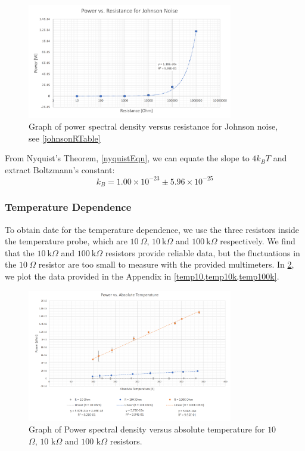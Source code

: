 \documentclass[12pt]{article}
\begin{document}
	\begin{figure}[H]
		\centering
		\includegraphics[width=0.8\textwidth]{powerR.png}
		\caption{Graph of power spectral density versus resistance for Johnson noise, see \cref{johnsonRTable}}
		\label{powerR}
	\end{figure}

	From Nyquist's Theorem, \cref{nyquistEqn}, we can equate the slope to $4k_BT$ and extract Boltzmann's constant:
	\begin{equation}
		k_B = 1.00 \times 10^{-23} \pm 5.96\times 10^{-25}
	\end{equation}
	
	
	
	\subsubsection*{Temperature Dependence}
	To obtain date for the temperature dependence, we use the three resistors inside the temperature probe, which are $10 \ \Omega$, $10 \ \text{k}\Omega$ and $100 \ \text{k}\Omega$ respectively. We find that the $10 \ \text{k}\Omega$ and $100 \ \text{k}\Omega$ resistors provide reliable data, but the fluctuations in the $10 \ \Omega$ resistor are too small to measure with the provided multimeters. In \cref{tempGraphs}, we plot the data provided in the Appendix in \cref{temp10,temp10k,temp100k}.
	
	\begin{figure}[H]
		\centering
		\includegraphics[width=0.8\textwidth]{TempGraph.PNG}
		\caption{Graph of Power spectral density versus absolute temperature for $10$ $\Omega$, $10$ k$\Omega$ and $100$ k$\Omega$ resistors.}
		\label{tempGraphs}
	\end{figure}
\end{document}
